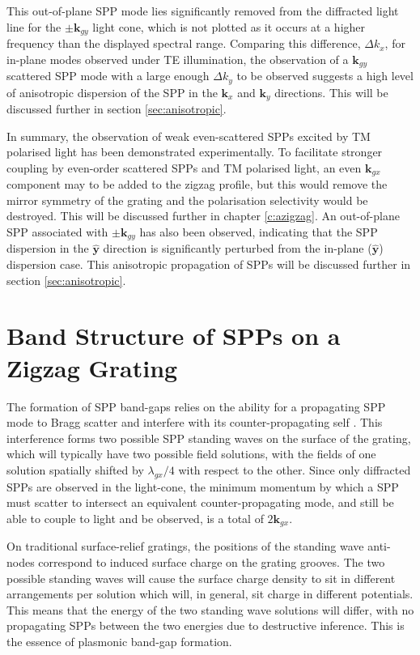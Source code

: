 This out-of-plane SPP mode lies significantly removed from the diffracted light line for the $\pm \mathbf{k}_{gy}$ light cone, which is not plotted as it occurs at a higher frequency than the displayed spectral range. Comparing this difference, $\Delta k_{x}$, for in-plane modes observed under TE illumination, the observation of a $\mathbf{k}_{gy}$ scattered SPP mode with a large enough $\Delta k_{y}$ to be observed suggests a high level of anisotropic dispersion of the SPP in the $\mathbf{k}_x$ and $\mathbf{k}_y$ directions. This will be discussed further in section \ref{sec:anisotropic}.

In summary, the observation of weak even-scattered SPPs excited by TM polarised light has been demonstrated experimentally. To facilitate stronger coupling by even-order scattered SPPs and TM polarised light, an even $\mathbf{k}_{gx}$ component may to be added to the zigzag profile, but this would remove the mirror symmetry of the grating and the polarisation selectivity would be destroyed. This will be discussed further in chapter \ref{c:azigzag}. An out-of-plane SPP associated with $\pm \mathbf{k}_{gy}$ has also been observed, indicating that the SPP dispersion in the $\hat{\mathbf{y}}$ direction is significantly perturbed  from the in-plane ($\hat{\mathbf{y}}$) dispersion case. This anisotropic propagation of SPPs will be discussed further in section \ref{sec:anisotropic}.

\section{Band Structure of SPPs on a Zigzag Grating\label{sec:bandgap-character}}
The formation of SPP band-gaps relies on the ability for a propagating SPP mode to Bragg scatter  and interfere with its counter-propagating self \cite{Barnes1995,Barnes1996}. This interference forms two possible SPP standing waves on the surface of the grating, which will typically have two possible field solutions, with the fields of one solution spatially shifted by $\lambda_{gx}/4$ with respect to the other. Since only diffracted SPPs are observed in the light-cone, the minimum momentum by which a SPP must scatter to intersect an equivalent counter-propagating mode, and still be able to couple to light and be observed, is a total of $2\mathbf{k}_{gx}$.

On traditional surface-relief gratings, the positions of the standing wave anti-nodes correspond to induced surface charge on the grating grooves. The two possible standing waves will cause the surface charge density to sit in different arrangements per solution which will, in general, sit charge in different potentials. This means that the energy of the two standing wave solutions will differ, with no propagating SPPs between the two energies due to destructive inference. This is the essence of plasmonic band-gap formation.

